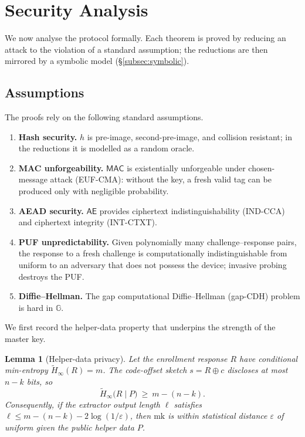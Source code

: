 \documentclass[11pt,a4paper]{article}
\newtheorem{lemma}[theorem]{Lemma}
\begin{document}
\section{Security Analysis}
\label{sec:security}

We now analyse the protocol formally. Each theorem is proved by reducing an
attack to the violation of a standard assumption; the reductions are then
mirrored by a symbolic model (\S\ref{subsec:symbolic}).

\subsection{Assumptions}
\label{subsec:assumptions}

The proofs rely on the following standard assumptions.
\begin{enumerate}[leftmargin=*]
  \item \textbf{Hash security.} $h$ is pre-image, second-pre-image, and
  collision resistant; in the reductions it is modelled as a random oracle.
  \item \textbf{MAC unforgeability.} $\mathsf{MAC}$ is existentially unforgeable
  under chosen-message attack (EUF-CMA): without the key, a fresh valid tag can
  be produced only with negligible probability.
  \item \textbf{AEAD security.} $\mathsf{AE}$ provides ciphertext
  indistinguishability (IND-CCA) and ciphertext integrity (INT-CTXT).
  \item \textbf{PUF unpredictability.} Given polynomially many
  challenge--response pairs, the response to a fresh challenge is
  computationally indistinguishable from uniform to an adversary that does not
  possess the device; invasive probing destroys the PUF.
  \item \textbf{Diffie--Hellman.} The gap computational Diffie--Hellman
  (gap-CDH) problem is hard in $\mathbb{G}$.
\end{enumerate}

We first record the helper-data property that underpins the strength of the
master key.

\begin{lemma}[Helper-data privacy]
\label{lem:helper}
Let the enrollment response $R$ have conditional min-entropy $\widetilde{H}_\infty(R)=m$.
The code-offset sketch $s=R\oplus c$ discloses at most $n-k$ bits, so
\begin{equation}
\widetilde{H}_\infty\big(R \mid P\big)\ \ge\ m-(n-k).
\end{equation}
Consequently, if the extractor output length $\ell$ satisfies
$\ell \le m-(n-k)-2\log(1/\varepsilon)$, then $\text{mk}$ is within statistical
distance $\varepsilon$ of uniform given the public helper data $P$.
\end{lemma}
\end{document}
